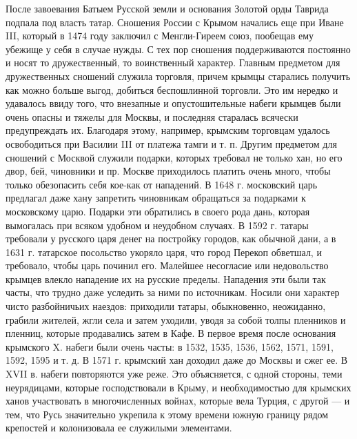 \begin{itemize}
\begin{itemize}
После завоевания Батыем Русской земли и основания Золотой орды Таврида подпала
под власть татар. Сношения России с Крымом начались еще при Иване III, который в
1474 году заключил с Менгли-Гиреем союз, пообещав ему убежище у себя в случае
нужды. С тех пор сношения поддерживаются постоянно и носят то дружественный, то
воинственный характер. Главным предметом для дружественных сношений служила
торговля, причем крымцы старались получить как можно больше выгод, добиться
беспошлинной торговли. Это им нередко и удавалось ввиду того, что внезапные и
опустошительные набеги крымцев были очень опасны и тяжелы для Москвы, и
последняя старалась всячески предупреждать их. Благодаря этому, например,
крымским торговцам удалось освободиться при Василии III от платежа тамги и т.
п. Другим предметом для сношений с Москвой служили подарки, которых требовал не
только хан, но его двор, бей, чиновники и пр. Москве приходилось платить очень
много, чтобы только обезопасить себя кое-как от нападений. В 1648 г. московский
царь предлагал даже хану запретить чиновникам обращаться за подарками к
московскому царю. Подарки эти обратились в своего рода дань, которая вымогалась
при всяком удобном и неудобном случаях. В 1592 г. татары требовали у русского
царя денег на постройку городов, как обычной дани, а в 1631 г. татарское
посольство укоряло царя, что город Перекоп обветшал, и требовало, чтобы царь
починил его. Малейшее несогласие или недовольство крымцев влекло нападение их
на русские пределы. Нападения эти были так часты, что трудно даже уследить за
ними по источникам. Носили они характер чисто разбойничьих наездов: приходили
татары, обыкновенно, неожиданно, грабили жителей, жгли села и затем уходили,
уводя за собой толпы пленников и пленниц, которые продавались затем в Кафе. В
первое время после основания крымского X. набеги были очень часты: в 1532,
1535, 1536, 1562, 1571, 1591, 1592, 1595 и т. д. В 1571 г. крымский хан доходил
даже до Москвы и сжег ее. В XVII в. набеги повторяются уже реже. Это
объясняется, с одной стороны, теми неурядицами, которые господствовали в Крыму,
и необходимостью для крымских ханов участвовать в многочисленных войнах,
которые вела Турция, с другой — и тем, что Русь значительно укрепила к этому
времени южную границу рядом крепостей и колонизовала ее служилыми элементами.



\end{itemize}
\end{itemize}
